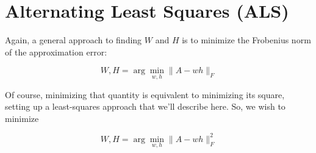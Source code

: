 % 
% 
% 
% 
% 
% 
% 
% 
% 
% 


\section{Alternating Least Squares (ALS)}

Again, a general approach to finding $W$ and $H$ is to minimize the
Frobenius norm of the approximation error:

\begin{equation}
\label{generalwh}
W,H = \arg \min_{w,h} \|A - wh\|_F
\end{equation}

Of course, minimizing that quantity is equivalent to minimizing its
square, setting up a least-squares approach that we'll describe here.
So, we wish to minimize

\begin{equation}
W,H = \arg \min_{w,h} \|A - wh\|_F^2
\end{equation}

